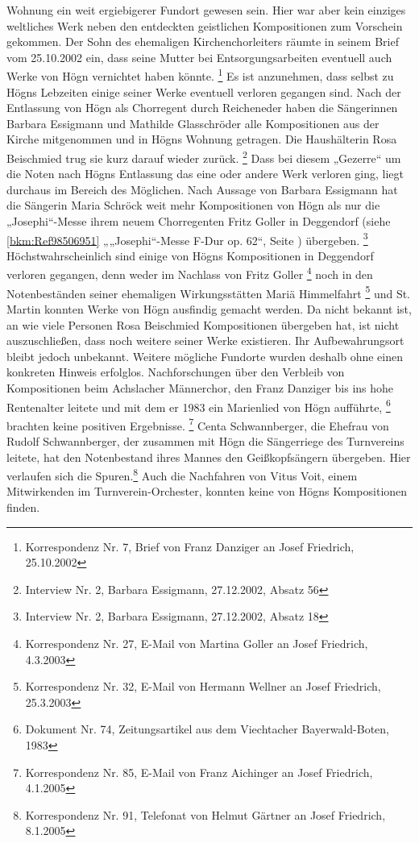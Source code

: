 Wohnung ein weit ergiebigerer Fundort gewesen sein. Hier war aber kein
einziges weltliches Werk neben den entdeckten geistlichen Kompositionen
zum Vorschein gekommen. Der Sohn des ehemaligen Kirchenchorleiters
räumte in seinem Brief vom 25.10.2002 ein, dass seine Mutter bei
Entsorgungsarbeiten eventuell auch Werke von Högn vernichtet haben
könnte. \footnote{Korrespondenz Nr. 7, Brief von Franz Danziger an
Josef Friedrich, 25.10.2002} Es ist anzunehmen, dass selbst zu Högns
Lebzeiten einige seiner Werke eventuell verloren gegangen sind. Nach
der Entlassung von Högn als Chorregent durch Reicheneder haben die
Sängerinnen Barbara Essigmann und Mathilde Glasschröder alle
Kompositionen aus der Kirche mitgenommen und in Högns Wohnung getragen.
Die Haushälterin Rosa Beischmied trug sie kurz darauf wieder
zurück. \footnote{Interview Nr. 2, Barbara Essigmann, 27.12.2002,
Absatz 56} Dass bei diesem „Gezerre“ um die Noten nach Högns Entlassung
das eine oder andere Werk verloren ging, liegt durchaus im Bereich des
Möglichen. Nach Aussage von Barbara Essigmann hat die Sängerin Maria
Schröck weit mehr Kompositionen von Högn als nur die „Josephi“-Messe
ihrem neuem Chorregenten Fritz Goller in Deggendorf (siehe
\ref{bkm:Ref98506951} „„Josephi“-Messe F-Dur op. 62“, Seite
\pageref{bkm:Ref98506963}) übergeben. \footnote{Interview Nr. 2,
Barbara Essigmann, 27.12.2002, Absatz 18} Höchstwahrscheinlich sind
einige von Högns Kompositionen in Deggendorf verloren gegangen, denn
weder im Nachlass von Fritz Goller \footnote{Korrespondenz Nr. 27,
E-Mail von Martina Goller an Josef Friedrich, 4.3.2003} noch in den
Notenbeständen seiner ehemaligen Wirkungsstätten Mariä
Himmelfahrt \footnote{Korrespondenz Nr. 32, E-Mail von Hermann Wellner
an Josef Friedrich, 25.3.2003} und St. Martin konnten Werke von Högn
ausfindig gemacht werden. Da nicht bekannt ist, an wie viele Personen
Rosa Beischmied Kompositionen übergeben hat, ist nicht auszuschließen,
dass noch weitere seiner Werke existieren. Ihr Aufbewahrungsort bleibt
jedoch unbekannt. Weitere mögliche Fundorte wurden deshalb ohne einen
konkreten Hinweis erfolglos. Nachforschungen über den Verbleib von
Kompositionen beim Achslacher Männerchor, den Franz Danziger bis ins
hohe Rentenalter leitete und mit dem er 1983 ein Marienlied von Högn
aufführte, \footnote{Dokument Nr. 74, Zeitungsartikel aus dem
Viechtacher Bayerwald-Boten, 1983} brachten keine positiven
Ergebnisse. \footnote{Korrespondenz Nr. 85, E-Mail von Franz Aichinger
an Josef Friedrich, 4.1.2005} Centa Schwannberger, die Ehefrau von
Rudolf Schwannberger, der zusammen mit Högn die Sängerriege des
Turnvereins leitete, hat den Notenbestand ihres Mannes den
Geißkopfsängern übergeben. Hier verlaufen sich die Spuren.\footnote{
Korrespondenz Nr. 91, Telefonat von Helmut Gärtner an Josef Friedrich,
8.1.2005} Auch die Nachfahren von Vitus Voit, einem Mitwirkenden im
Turnverein-Orchester, konnten keine von Högns Kompositionen finden.

